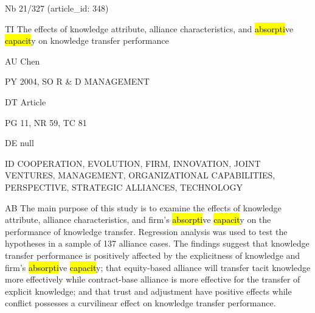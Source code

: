 \documentclass[a4paper]{article}
\begin{document}
\vspace*{-2cm}
Nb \tabto{0cm}21/327 (article\_id: 348)\par
TI \tabto{0cm}The effects of knowledge attribute, alliance characteristics, and \hl{absorpti}ve \hl{capacit}y on knowledge transfer performance\par
AU \tabto{0cm}Chen\par
PY \tabto{0cm}2004, SO R \& D MANAGEMENT\par
DT \tabto{0cm}Article\par
PG \tabto{0cm}11, NR 59, TC 81\par
DE \tabto{0cm}null\par
ID \tabto{0cm}COOPERATION, EVOLUTION, FIRM, INNOVATION, JOINT VENTURES, MANAGEMENT, ORGANIZATIONAL CAPABILITIES, PERSPECTIVE, STRATEGIC ALLIANCES, TECHNOLOGY\par
AB \tabto{0cm}The main purpose of this study is to examine the effects of knowledge attribute, alliance characteristics, and firm's \hl{absorpti}ve \hl{capacit}y on the performance of knowledge transfer. Regression analysis was used to test the hypotheses in a sample of 137 alliance cases. The findings suggest that knowledge transfer performance is positively affected by the explicitness of knowledge and firm's \hl{absorpti}ve \hl{capacit}y; that equity-based alliance will transfer tacit knowledge more effectively while contract-base alliance is more effective for the transfer of explicit knowledge; and that trust and adjustment have positive effects while conflict possesses a curvilinear effect on knowledge transfer performance.\par
\clearpage
\end{document}
